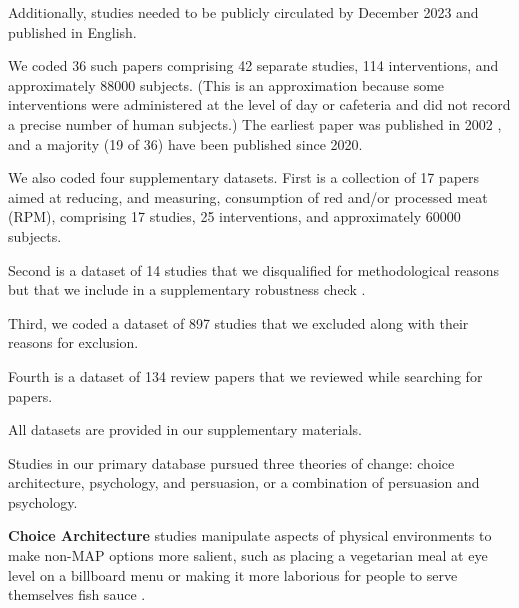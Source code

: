 \documentclass[sn-nature,pdflatex]{sn-jnl}
\begin{document}
Additionally, studies needed to be publicly circulated by December 2023
and published in English.

We coded 36 such papers
\citep{andersson2021, kanchanachitra2020, abrahamse2007, acharya2004, banerjee2019, bianchi2022, bochmann2017, bschaden2020, carfora2023, hennessy2016, piester2020, cooney2014, cooney2016, feltz2022, haile2021, hatami2018, jalil2023, mathur2021effectiveness, merrill2009, norris2014, peacock2017, polanco2022, sparkman2021, weingarten2022, aldoh2023, allen2002, camp2019, coker2022, griesoph2021, sparkman2017, sparkman2020, berndsen2005, bertolaso2015, fehrenbach2015, mattson2020, shreedhar2021}
comprising 42 separate studies, 114 interventions, and approximately
88000 subjects. (This is an approximation because some interventions
were administered at the level of day or cafeteria and did not record a
precise number of human subjects.) The earliest paper was published in
2002 \citep{allen2002}, and a majority (19 of 36) have been published
since 2020.

We also coded four supplementary datasets. First is a collection of 17
papers
\citep{anderson2017, carfora2017correlational, carfora2017randomised, carfora2019, carfora2019informational, delichatsios2001talking, dijkstra2022, emmons2005cancer, emmons2005project, jaacks2014, james2015, lee2018, perino2022, schatzkin2000, sorensen2005, wolstenholme2020}
aimed at reducing, and measuring, consumption of red and/or processed
meat (RPM), comprising 17 studies, 25 interventions, and approximately
60000 subjects.

Second is a dataset of 14 studies that we disqualified for
methodological reasons but that we include in a supplementary robustness
check
\citep{alblas2023, beresford2006, dannenberg2023, delichatsios2001eatsmart, epperson2021, frie2022, garnett2020, hansen2021, kaiser2020, lentz2020, lindstrom2015, loy2016, piazza2022, reinders2017, vlaeminck2014}.

Third, we coded a dataset of 897 studies that we excluded along with
their reasons for exclusion.

Fourth is a dataset of 134 review papers that we reviewed while
searching for papers.

All datasets are provided in our supplementary materials.

Studies in our primary database pursued three theories of change: choice
architecture, psychology, and persuasion, or a combination of persuasion
and psychology.

\textbf{Choice Architecture} studies
\citep{andersson2021, kanchanachitra2020} manipulate aspects of physical
environments to make non-MAP options more salient, such as placing a
vegetarian meal at eye level on a billboard menu \citep{andersson2021}
or making it more laborious for people to serve themselves fish sauce
\citep{kanchanachitra2020}.
\end{document}
